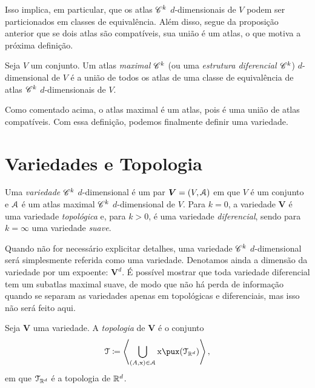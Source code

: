 Isso implica, em particular, que os atlas $\mathscr{C}^k$ $d$-dimensionais de $V$ podem ser particionados em classes de equivalência. Além disso, segue da proposição anterior que se dois atlas são compatíveis, sua união é um atlas, o que motiva a próxima definição.

\begin{defi}
Seja $V$ um conjunto. Um atlas \emph{maximal} $\mathscr{C}^k$ (ou uma \emph{estrutura diferencial $\mathscr{C}^k$}) $d$-dimensional de $V$ é a união de todos os atlas de uma classe de equivalência de atlas $\mathscr{C}^k$ $d$-dimensionais de $V$.
\end{defi}

Como comentado acima, o atlas maximal é um atlas, pois é uma união de atlas compatíveis. Com essa definição, podemos finalmente definir uma variedade.

\section{Variedades e Topologia}

\begin{defi}
Uma \emph{variedade} $\mathscr{C}^k$ $d$-dimensional é um par $\bm V=(V,\mathcal{A})$ em que $V$ é um conjunto e $\mathcal{A}$ é um atlas maximal $\mathscr{C}^k$ $d$-dimensional de $V$. Para $k=0$, a variedade $\bm V$ é uma variedade \emph{topológica} e, para $k>0$, é uma variedade \emph{diferencial}, sendo para $k=\infty$ uma variedade \emph{suave}.
\end{defi}

Quando não for necessário explicitar detalhes, uma variedade $\mathscr{C}^k$ $d$-dimensional será simplesmente referida como uma variedade. Denotamos ainda a dimensão da variedade por um expoente: $\bm V^d$. É possível mostrar que toda variedade diferencial tem um subatlas maximal suave, de modo que não há perda de informação quando se separam as variedades apenas em topológicas e diferenciais, mas isso não será feito aqui.


\begin{defi}
Seja $\bm V$ uma variedade. A \emph{topologia} de $\bm V$ é o conjunto
	\begin{equation*}
	\topo \coloneqq  \ger{\bigcup_{(A,\x) \in \atlas} \x\pux(\topo_{\R^d})},
	\end{equation*}
em que $\mathcal{T}_{\mathbb{R}^d}$ é a topologia de $\mathbb{R}^d$.
\end{defi}

